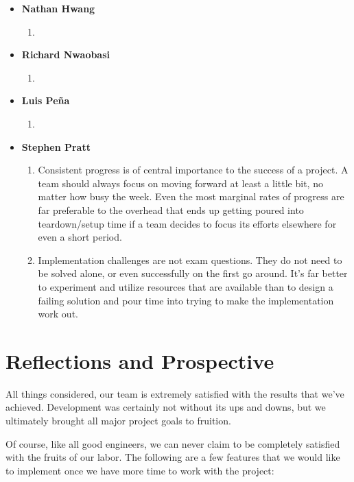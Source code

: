 \documentclass{article}
\begin{document}
\begin{itemize}

\item
\textbf{Nathan Hwang}
\begin{enumerate}
\item 
\end{enumerate}

\item 
\textbf{Richard Nwaobasi}
\begin{enumerate}
\item 
\end{enumerate}

\item 
\textbf{Luis Pe\~{n}a}
\begin{enumerate}
\item 
\end{enumerate}

\item 
\textbf{Stephen Pratt}
\begin{enumerate}
\item Consistent progress is of central importance to the success of a project. A team should always focus on 
moving forward at least a little bit, no matter how busy the week. Even the most marginal rates of progress are far preferable
to the overhead that ends up getting poured into teardown/setup time if a team decides to focus its efforts elsewhere
for even a short period.
\item Implementation challenges are not exam questions. They do not need to be solved alone, or even successfully on 
the first go around. It's far better to experiment and utilize resources that are available than to design a failing
solution and pour time into trying to make the implementation work out.
\end{enumerate}

\end{itemize}


\section{Reflections and Prospective}

All things considered, our team is extremely satisfied with the results that we've achieved. 
Development was certainly not without its ups and downs, but we ultimately brought all major project
goals to fruition. 

Of course, like all good engineers, we can never claim to be completely satisfied with the fruits of our
labor. The following are a few features that we would like to implement once we have more time 
to work with the project:
\end{document}
